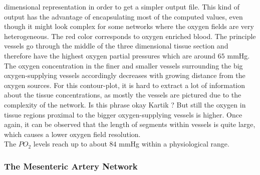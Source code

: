 dimensional representation in order to get a simpler output file. This kind of output has the advantage of encapsulating most of the computed values, even though it might look complex for some networks where the oxygen fields are very heterogeneous. The red color corresponds to oxygen enriched blood. The principle vessels go through the middle of the three dimensional tissue section and therefore have the highest oxygen partial pressures which are around $65$ mmHg. The oxygen concentration in the finer and smaller vessels surrounding the big oxygen-supplying vessels accordingly decreases with growing distance from the oxygen sources. {\color{red}For this contour-plot, it is hard to extract a lot of information about the tissue concentrations, as mostly the vessels are pictured due to the complexity of the network. Is this phrase okay Kartik ?}
But still the oxygen in tissue regions proximal to the bigger oxygen-supplying vessels is higher. Once again, it can be observed that the length of segments within vessels is quite large, which causes a lower oxygen field resolution.
\\The $PO_2$ levels reach up to about $84$ mmHg within a physiological range.

\newpage
\subsubsection*{The Mesenteric Artery Network}

